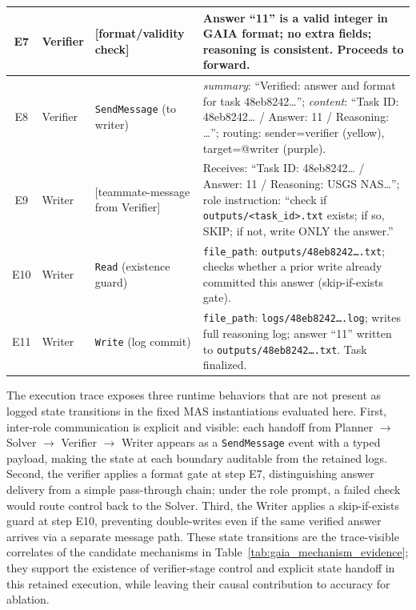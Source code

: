 \begin{table}[t]
{\begin{tabular}{cp{}p{}p{}}
        \midrule
        E7 & Verifier & [format/validity check] & Answer ``11'' is a valid integer in GAIA format; no extra fields; reasoning is consistent. Proceeds to forward. \\
        \midrule
        E8 & Verifier & \texttt{SendMessage} (to writer) & \textit{summary}: ``Verified: answer and format for task 48eb8242{\ldots}''; \textit{content}: ``Task ID: 48eb8242{\ldots} / Answer: 11 / Reasoning: \ldots''; routing: sender=verifier (yellow), target=@writer (purple). \\
        \midrule
        E9 & Writer & [teammate-message from Verifier] & Receives: ``Task ID: 48eb8242{\ldots} / Answer: 11 / Reasoning: USGS NAS{\ldots}''; role instruction: ``check if \texttt{outputs/<task\_id>.txt} exists; if so, SKIP; if not, write ONLY the answer.'' \\
        \midrule
        E10 & Writer & \texttt{Read} (existence guard) & \texttt{file\_path}: \texttt{outputs/48eb8242{\ldots}.txt}; checks whether a prior write already committed this answer (skip-if-exists gate). \\
        \midrule
        E11 & Writer & \texttt{Write} (log commit) & \texttt{file\_path}: \texttt{logs/48eb8242{\ldots}.log}; writes full reasoning log; answer ``11'' written to \texttt{outputs/48eb8242{\ldots}.txt}. Task finalized. \\
        \bottomrule
    \end{tabular}
    }
\end{table}

The execution trace exposes three runtime behaviors that are not present as logged state transitions in the fixed MAS instantiations evaluated here. First, inter-role communication is explicit and visible: each handoff from Planner $\to$ Solver $\to$ Verifier $\to$ Writer appears as a \texttt{SendMessage} event with a typed payload, making the state at each boundary auditable from the retained logs. Second, the verifier applies a format gate at step E7, distinguishing answer delivery from a simple pass-through chain; under the role prompt, a failed check would route control back to the Solver. Third, the Writer applies a skip-if-exists guard at step E10, preventing double-writes even if the same verified answer arrives via a separate message path. These state transitions are the trace-visible correlates of the candidate mechanisms in Table~\ref{tab:gaia_mechanism_evidence}; they support the existence of verifier-stage control and explicit state handoff in this retained execution, while leaving their causal contribution to accuracy for ablation.

